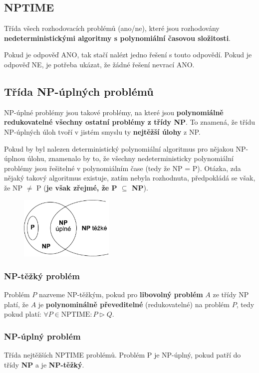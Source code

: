 \subsection{NPTIME}
Třída všech rozhodovacích problémů (ano/ne), které jsou rozhodovány \textbf{nedeterministickými algoritmy s polynomiální časovou složitosti}.

Pokud je odpověď ANO, tak stačí nalézt jedno řešení s touto odpovědí. Pokud je odpověď NE, je potřeba ukázat, že žádné řešení nevrací ANO.

\subsection{Třída NP-úplných problémů}
NP-úplné problémy jsou takové problémy, na které jsou \textbf{polynomiálně redukovatelné všechny ostatní problémy z třídy NP}. To znamená, že třídu NP-úplných úloh tvoří v jistém smyslu ty \textbf{nejtěžší úlohy} z NP. 

Pokud by byl nalezen deterministický polynomiální algoritmus pro nějakou NP-úplnou úlohu, znamenalo by to, že všechny nedeterministicky polynomiální problémy jsou řešitelné v polynomiálním čase (tedy že NP = P). Otázka, zda nějaký takový algoritmus existuje, zatím nebyla rozhodnuta, předpokládá se však, že NP $\neq$ P (\textbf{je však zřejmé, že P $\subseteq$ NP}).

\begin{figure}[H]
	\centering
	\includegraphics[width=0.4\textwidth]{assets/np_problemy}
\end{figure}

\subsubsection{NP-těžký problém}
Problém $P$ nazveme NP-těžkým, pokud pro \textbf{libovolný problém} $A$ ze třídy NP platí, že $A$ je \textbf{polynominálně převeditelné} (redukovatelné) na problém $P$, tedy pokud platí:
$\forall P \in \textrm{NPTIME}: P \triangleright Q$.

\subsubsection{NP-úplný problém}
Třída nejtěžších NPTIME problémů. Problém P je NP-úplný, pokud patří do třídy \textbf{NP} a je \textbf{NP-těžký}.

